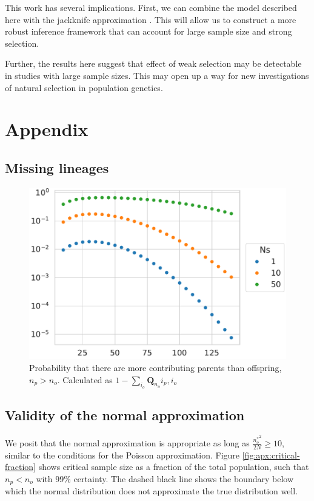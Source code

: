 \documentclass[review]{elsarticle}
\begin{document}
This work has several implications. First, we can combine the model described here with the
jackknife approximation \citep{JouganousEtAl2017}. This will allow us to construct a more robust
inference framework that can account for large sample size and strong selection.

Further, the results here suggest that effect of weak selection may be detectable in studies with
large sample sizes. This may open up a way for new investigations of natural selection in population
genetics.



\section{Appendix}

\subsection{Missing lineages}

\begin{figure}
  \centering
  \includegraphics[width=\textwidth]{fig/missing.pdf}
  \caption{Probability that there are more contributing parents than offspring, $n_p > n_o$.
    Calculated as $1-\sum_{i_o} \mathbf{Q}_{n_o}{i_p, i_o}$}
  \label{fig:apx:missing}
\end{figure}

\subsection{Validity of the normal approximation}

We posit that the normal approximation is appropriate as long as $\frac{{n_o^*}^2}{2N} \ge 10$,
similar to the conditions for the Poisson approximation. Figure \ref{fig:apx:critical-fraction}
shows critical sample size as a fraction of the total population, such that $n_p < n_o$ with $99\%$
certainty. The dashed black line shows the boundary below which the normal distribution does not
approximate the true distribution well.
\end{document}
